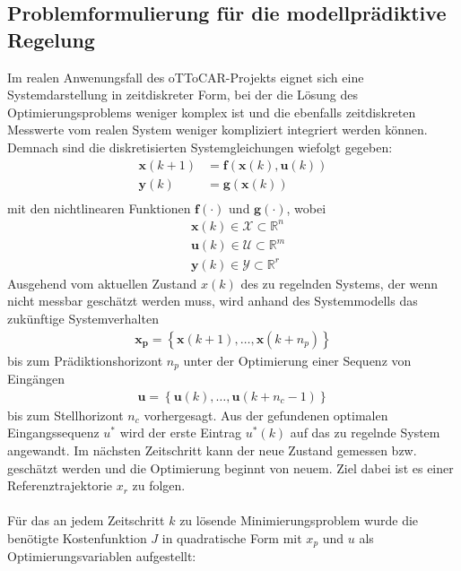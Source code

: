 \subsection{Problemformulierung für die modellprädiktive Regelung}
Im realen Anwenungsfall des oTToCAR-Projekts eignet sich eine Systemdarstellung in zeitdiskreter Form, bei der die Lösung des Optimierungsproblems weniger komplex ist und die ebenfalls zeitdiskreten Messwerte vom realen System weniger kompliziert integriert werden können. Demnach sind die diskretisierten Systemgleichungen wiefolgt gegeben:
\begin{align*}
  \boldsymbol{x}(k+1)&=\boldsymbol{f}\left ( \boldsymbol{x}(k), \boldsymbol{u}(k) \right )\\
  \boldsymbol{y}(k)&=\boldsymbol{g}\left ( \boldsymbol{x}(k) \right )\\
\end{align*}
mit den nichtlinearen Funktionen $\boldsymbol{f}\left ( \cdot \right )$ und $\boldsymbol{g}\left ( \cdot \right )$, wobei
\begin{align*}
  &\boldsymbol{x}(k) \in \mathcal{X}\subset\mathbb{R}^n\\
  &\boldsymbol{u}(k) \in \mathcal{U}\subset\mathbb{R}^m\\
  &\boldsymbol{y}(k) \in \mathcal{Y}\subset\mathbb{R}^r
\end{align*}
Ausgehend vom aktuellen Zustand $x(k)$ des zu regelnden Systems, der wenn nicht messbar geschätzt werden muss, wird anhand des Systemmodells das zukünftige Systemverhalten
\begin{align*}
  \boldsymbol{x_p}=\left\{ \boldsymbol{x}(k+1),\dots,\boldsymbol{x}(k+n_p)\right\}
\end{align*}
bis zum Prädiktionshorizont $n_p$ unter der Optimierung einer Sequenz von Eingängen
\begin{align*}
  \boldsymbol{u}=\left\{ \boldsymbol{u}(k),\dots,\boldsymbol{u}(k+n_c-1)\right\}
\end{align*}
bis zum Stellhorizont $n_c$ vorhergesagt. Aus der gefundenen optimalen Eingangssequenz $u^*$ wird der erste Eintrag $u^*(k)$ auf das zu regelnde System angewandt. Im nächsten Zeitschritt kann der neue Zustand gemessen bzw. geschätzt werden und die Optimierung beginnt von neuem. Ziel dabei ist es einer Referenztrajektorie $x_r$ zu folgen.\\ \\
Für das an jedem Zeitschritt $k$ zu lösende Minimierungsproblem wurde die benötigte Kostenfunktion $J$ in quadratische Form mit $x_p$ und $u$ als Optimierungsvariablen aufgestellt:
